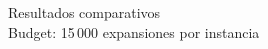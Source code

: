 \documentclass{beamer}
\begin{document}
\newcommand{\hmlegend}{%
  \vspace{2pt}
  {\tiny
    \textcolor{cB1}{$\blacksquare$}~$\le100$\quad
    \textcolor{cB2}{$\blacksquare$}~$\le999$\quad
    \textcolor{cB3}{$\blacksquare$}~$\le5000$\quad
    \textcolor{cB4}{$\blacksquare$}~$\le15000$\quad
    \textcolor{white}{$\blacksquare$}\llap{\colorbox{black}{\phantom{X}}}~timeout
  }
}

\begin{frame}{}
\begin{center}
\Huge Resultados comparativos\\[0.5em]
\large Budget: 15\,000 expansiones por instancia
\end{center}
\end{frame}
\end{document}
